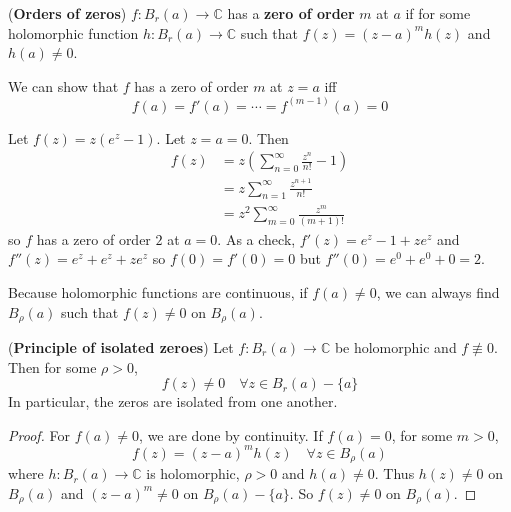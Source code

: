 \begin{definition}
	(\textbf{Orders of zeros}) $f: B_r(a) \rightarrow \mathbb{C}$ has a \textbf{zero of order} $m$ at $a$ if for some holomorphic function $h: B_r(a) \rightarrow \mathbb{C}$ such that $f(z) = {(z - a)}^m h(z)$ and $h(a) \ne 0$.
\end{definition}

\begin{remark}
	We can show that $f$ has a zero of order $m$ at $z = a$ iff
	\[
		f(a) = f'(a) = \cdots = f^{(m - 1)} (a) = 0
	\]
\end{remark}

\begin{example}
	Let $f(z) = z (e^z - 1)$. Let $z = a = 0$. Then
	\[
		\begin{aligned}
			f(z)
				& = z \left( \sum_{n=  0}^{\infty} \frac{z^n}{n!} - 1 \right) \\
				& = z \sum_{n = 1}^{\infty} \frac{z^{n + 1}}{n!} \\
				& = z^2 \sum_{m = 0}^{\infty} \frac{z^m}{(m + 1)!}
		\end{aligned}
	\]
	so $f$ has a zero of order $2$ at $a = 0$. As a check, $f'(z) = e^z - 1 + ze^z$ and $f''(z) = e^z + e^z + ze^z$ so $f(0) = f'(0) = 0$ but $f''(0) = e^0 + e^0 + 0 = 2$.
\end{example}

\begin{remark}
	Because holomorphic functions are continuous, if $f(a) \ne 0$, we can always find $B_{\rho} (a)$ such that $f(z) \ne 0$ on $B_{\rho}(a)$.
\end{remark}

\begin{theorem}
	(\textbf{Principle of isolated zeroes}) Let $f: B_r(a) \rightarrow \mathbb{C}$ be holomorphic and $f \not\equiv 0$. Then for some $\rho > 0$,
	\[
		f(z) \ne 0 \quad \forall z \in B_r(a) - \{ a \}
	\]
	In particular, the zeros are isolated from one another.
\end{theorem}

\begin{proof}
	For $f(a) \ne 0$, we are done by continuity. If $f(a) = 0$, for some $m > 0$,
	\[
		f(z) = {(z - a)}^m h(z) \quad \forall z \in B_{\rho}(a)
	\]
	where $h: B_r(a) \rightarrow \mathbb{C}$ is holomorphic, $\rho > 0$ and $h(a) \ne 0$. Thus $h(z) \ne 0$ on $B_{\rho}(a)$ and ${(z - a)}^m \ne 0$ on $B_{\rho} (a) - \{ a \}$. So $f(z) \ne 0$ on $B_{\rho}(a)$.
\end{proof}

